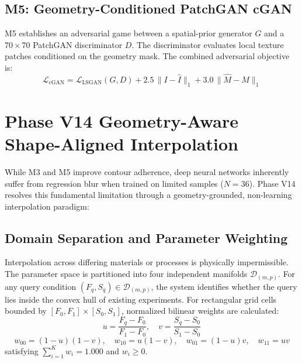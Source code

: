 \documentclass[12pt,a4paper,oneside]{report}
\begin{document}
\subsection{M5: Geometry-Conditioned PatchGAN cGAN}
M5 establishes an adversarial game between a spatial-prior generator $G$ and a $70 \times 70$ PatchGAN discriminator $D$. The discriminator evaluates local texture patches conditioned on the geometry mask. The combined adversarial objective is:
\begin{equation}
    \mathcal{L}_{\text{cGAN}} = \mathcal{L}_{\text{LSGAN}}(G, D) + 2.5\,\|I - \hat{I}\|_1 + 3.0\,\|\hat{M} - M\|_1
\end{equation}

\section{Phase V14 Geometry-Aware Shape-Aligned Interpolation}
While M3 and M5 improve contour adherence, deep neural networks inherently suffer from regression blur when trained on limited samples ($N=36$). Phase V14 resolves this fundamental limitation through a geometry-grounded, non-learning interpolation paradigm:

\subsection{Domain Separation and Parameter Weighting}
Interpolation across differing materials or processes is physically impermissible. The parameter space is partitioned into four independent manifolds $\mathcal{D}_{(m, p)}$. For any query condition $(F_q, S_q) \in \mathcal{D}_{(m, p)}$, the system identifies whether the query lies inside the convex hull of existing experiments. For rectangular grid cells bounded by $[F_0, F_1] \times [S_0, S_1]$, normalized bilinear weights are calculated:
\begin{equation}
    u = \frac{F_q - F_0}{F_1 - F_0}, \quad v = \frac{S_q - S_0}{S_1 - S_0}
\end{equation}
\begin{equation}
    w_{00} = (1-u)(1-v),\quad w_{10} = u(1-v),\quad w_{01} = (1-u)v,\quad w_{11} = uv
\end{equation}
satisfying $\sum_{i=1}^{K} w_i = 1.000$ and $w_i \ge 0$.
\end{document}
